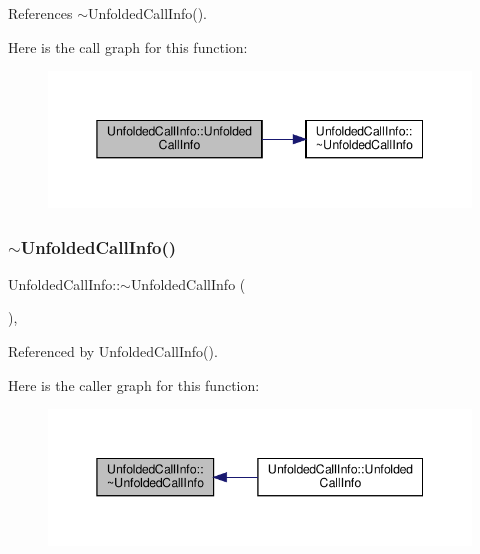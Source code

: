 References $\sim$\+Unfolded\+Call\+Info().

Here is the call graph for this function\+:
\nopagebreak
\begin{figure}[H]
\begin{center}
\leavevmode
\includegraphics[width=345pt]{d0/dd3/classUnfoldedCallInfo_a5e84b77ffbd321375bd25ea34b65cdba_cgraph}
\end{center}
\end{figure}
\mbox{\label{classUnfoldedCallInfo_a3d2273e0c9f0ecffa4c157c82ba45d98}} 
\subsubsection{\texorpdfstring{$\sim$\+Unfolded\+Call\+Info()}{~UnfoldedCallInfo()}}
{\footnotesize\ttfamily Unfolded\+Call\+Info\+::$\sim$\+Unfolded\+Call\+Info (\begin{DoxyParamCaption}{ }\end{DoxyParamCaption})\hspace{0.3cm}{\ttfamily [override]}, {\ttfamily [default]}}



Referenced by Unfolded\+Call\+Info().

Here is the caller graph for this function\+:
\nopagebreak
\begin{figure}[H]
\begin{center}
\leavevmode
\includegraphics[width=345pt]{d0/dd3/classUnfoldedCallInfo_a3d2273e0c9f0ecffa4c157c82ba45d98_icgraph}
\end{center}
\end{figure}


